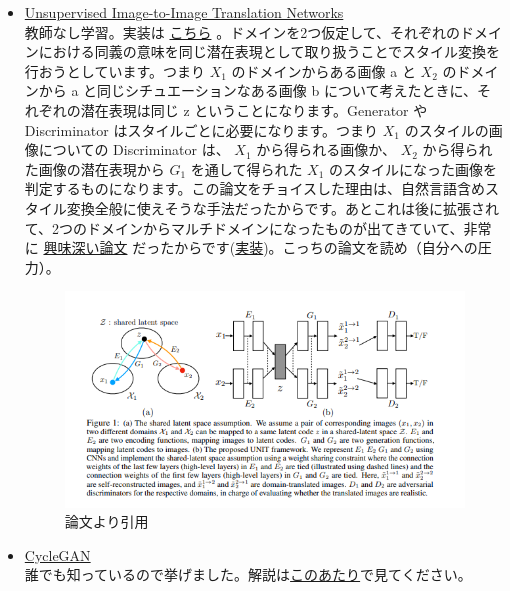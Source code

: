 \documentclass[a4paper, dvipdfmx, 10pt]{article}
\begin{document}
\begin{itemize}
\item \href{https://arxiv.org/pdf/1703.00848.pdf}{Unsupervised Image-to-Image Translation Networks}\\

教師なし学習。実装は \href{https://github.com/mingyuliutw/unit}{こちら} 。ドメインを2つ仮定して、それぞれのドメインにおける同義の意味を同じ潜在表現として取り扱うことでスタイル変換を行おうとしています。つまり \(X_1\) のドメインからある画像 a と \(X_2\) のドメインから a と同じシチュエーションなある画像 b について考えたときに、それぞれの潜在表現は同じ z ということになります。Generator や Discriminator はスタイルごとに必要になります。つまり \(X_1\) のスタイルの画像についての Discriminator は、 \(X_1\) から得られる画像か、 \(X_2\) から得られた画像の潜在表現から \(G_1\) を通して得られた \(X_1\) のスタイルになった画像を判定するものになります。この論文をチョイスした理由は、自然言語含めスタイル変換全般に使えそうな手法だったからです。あとこれは後に拡張されて、2つのドメインからマルチドメインになったものが出てきていて、非常に \href{https://github.com/NVlabs/MUNIT}{興味深い論文} だったからです(\href{https://github.com/NVlabs/MUNIT}{実装})。こっちの論文を読め（自分への圧力）。\\

\begin{figure}[htbp]
\centering
\includegraphics[width=.9\linewidth]{./img/uiit_abst.PNG}
\caption{論文より引用}
\end{figure}

\item \href{https://arxiv.org/abs/1703.10593}{CycleGAN}\\

誰でも知っているので挙げました。解説は\href{https://qiita.com/hikaru-light/items/98d06b21b4f3e2bb6ca4}{このあたり}で見てください。\\
\end{itemize}
\end{document}
